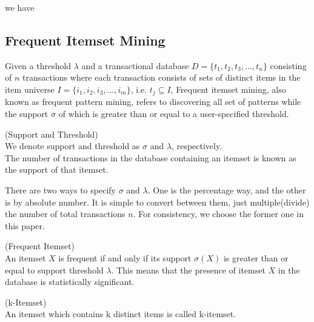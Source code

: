\documentclass[conference]{IEEEtran}
\begin{document}

we have

\subsection{Frequent Itemset Mining}%
Given a threshold  $\lambda$ and a transactional database $D=\{t_1,t_2,t_3,\dots,t_n\}$ consisting of $n$ transactions where each transaction consists of sets of distinct items in the item universe $I=\{i_1,i_2,i_3,\dots,i_m\}$, i.e. $t_j\subseteq I$,
Frequent itemset mining, also known as frequent pattern mining, refers to discovering all set of patterns while the support $\sigma$ of which is greater than or equal to a user-specified threshold.

\begin{definition}{(Support and Threshold)}\\%
We denote support and threshold as $\sigma$ and $\lambda$, respectively.\\
The number of transactions in the database containing an itemset is known as the support of that itemset.
\end{definition}
There are two ways to specify $\sigma$ and $\lambda$. One is the percentage way, and the other is by absolute number.
It is simple to convert between them, just multiple(divide) the number of total transactions $n$.
For consistency, we choose the former one in this paper.

\begin{definition}{(Frequent Itemset)}\\%
An itemset $X$ is frequent if and only if its support $\sigma(X)$ is greater than or equal to support threshold $\lambda$.
This means that the presence of itemset $X$ in the database is statistically significant.
\end{definition}{}

\begin{definition}{(k-Itemset)}\\%
An itemset which contains k distinct items is called k-itemset.
\end{definition}{}

\end{document}
